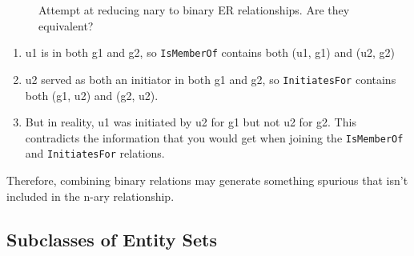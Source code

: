 \begin{example}
\begin{figure}[H]
\begin{subfigure}[b]{0.48\textwidth}
          \caption{}
          \label{fig:er-separate}
        \end{subfigure}
        \caption{Attempt at reducing nary to binary ER relationships. Are they equivalent?}
        \label{fig:er-comparison}
      \end{figure}

      \begin{enumerate}
        \item u1 is in both g1 and g2, so \texttt{IsMemberOf} contains both (u1, g1) and (u2, g2)
        \item u2 served as both an initiator in both g1 and g2, so \texttt{InitiatesFor} contains both (g1, u2) and (g2, u2). 
        \item But in reality, u1 was initiated by u2 for g1 but not u2 for g2. This contradicts the information that you would get when joining the \texttt{IsMemberOf} and \texttt{InitiatesFor} relations. 
      \end{enumerate}
      Therefore, combining binary relations may generate something spurious that isn't included in the n-ary relationship. 
    \end{example}

\subsection{Subclasses of Entity Sets}

